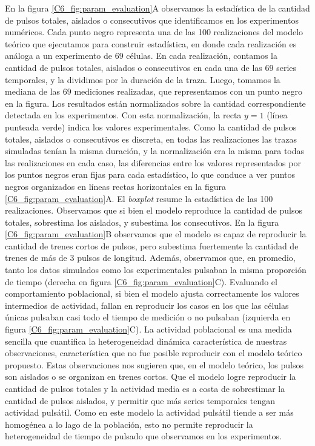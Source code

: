 \documentclass[./main.tex]{subfiles}
\begin{document}
En la figura \ref{C6_fig:param_evaluation}A observamos la estadística de la cantidad de pulsos totales, aislados o consecutivos que identificamos en los experimentos numéricos. Cada punto negro representa una de las 100 realizaciones del modelo teórico que ejecutamos para construir estadística, en donde cada realización es análoga a un experimento de $69$ células. En cada realización, contamos la cantidad de pulsos totales, aislados o consecutivos en cada una de las $69$ series temporales, y la dividimos por la duración de la traza. Luego, tomamos la mediana de las $69$ mediciones realizadas, que representamos con un punto negro en la figura. Los resultados están normalizados sobre la cantidad correspondiente detectada en los experimentos. Con esta normalización, la recta $y = 1$ (línea punteada verde) indica los valores experimentales. Como la cantidad de pulsos totales, aislados o consecutivos es discreta, en todas las realizaciones las trazas simuladas tenían la misma duración, y la normalización era la misma para todas las realizaciones en cada caso, las diferencias entre los valores representados por los puntos negros eran fijas para cada estadístico, lo que conduce a ver puntos negros organizados en líneas rectas horizontales en la figura \ref{C6_fig:param_evaluation}A. El \textit{boxplot} resume la estadística de las 100 realizaciones. Observamos que si bien el modelo reproduce la cantidad de pulsos totales, sobrestima los aislados, y subestima los consecutivos. En la figura \ref{C6_fig:param_evaluation}B observamos que el modelo es capaz de reproducir la cantidad de trenes cortos de pulsos, pero subestima fuertemente la cantidad de trenes de más de $3$ pulsos de longitud. Además, observamos que, en promedio, tanto los datos simulados como los experimentales pulsaban la misma proporción de tiempo (derecha en figura \ref{C6_fig:param_evaluation}C). Evaluando el comportamiento poblacional, si bien el modelo ajusta correctamente los valores intermedios de actividad, fallan en reproducir los casos en los que las células únicas pulsaban casi todo el tiempo de medición o no pulsaban (izquierda en figura \ref{C6_fig:param_evaluation}C). La actividad poblacional es una medida sencilla que cuantifica la heterogeneidad dinámica característica de nuestras observaciones, característica que no fue posible reproducir con el modelo teórico propuesto. Estas observaciones nos sugieren que, en el modelo teórico, los pulsos son aislados o se organizan en trenes cortos. Que el modelo logre reproducir la cantidad de pulsos totales y la actividad media es a costa de sobrestimar la cantidad de pulsos aislados, y permitir que más series temporales tengan actividad pulsátil. Como en este modelo la actividad pulsátil tiende a ser más homogénea a lo lago de la población, esto no permite reproducir la heterogeneidad de tiempo de pulsado que observamos en los experimentos. 
\end{document}
